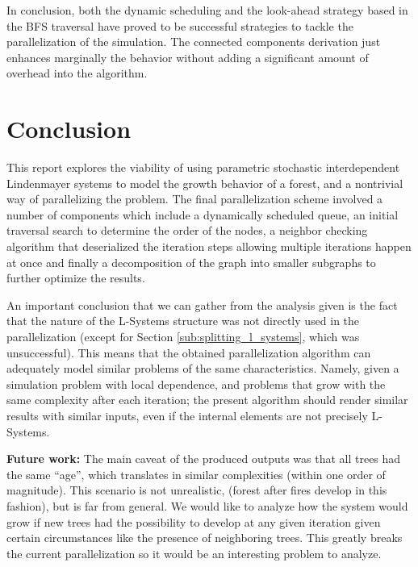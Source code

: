 \documentclass[letterpaper,twoside,11pt]{article}
\begin{document}
\begin{multicols}{2}
In conclusion, both the dynamic scheduling and the look-ahead strategy based in the BFS traversal have proved to be successful strategies to tackle the parallelization of the simulation. The connected components derivation just enhances marginally the behavior without adding a significant amount of overhead into the algorithm.



\section{Conclusion} %
\label{sec:conclusion}

This report explores the viability of using parametric stochastic interdependent Lindenmayer systems to model the growth behavior of a forest, and a nontrivial way of parallelizing the problem. The final parallelization scheme involved a number of components which include a dynamically scheduled queue, an initial traversal search to determine the order of the nodes, a neighbor checking algorithm that deserialized the iteration steps allowing multiple iterations happen at once and finally a decomposition of the graph into smaller subgraphs to further optimize the results.

An important conclusion that we can gather from the analysis given is the fact that the nature of the L-Systems structure was not directly used in the parallelization (except for Section \ref{sub:splitting_l_systems}, which was unsuccessful). This means that the obtained parallelization algorithm can adequately model similar problems of the same characteristics. Namely, given a simulation problem with local dependence, and problems that grow with the same complexity after each iteration; the present algorithm should render similar results with similar inputs, even if the internal elements are not precisely L-Systems.

\textbf{Future work:} The main caveat of the produced outputs was that all trees had the same ``age'', which translates in similar complexities (within one order of magnitude). This scenario is not unrealistic, (forest after fires develop in this fashion), but is far from general. We would like to analyze how the system would grow if new trees had the possibility to develop at any given iteration given certain circumstances like the presence of neighboring trees. This greatly breaks the current parallelization so it would be an interesting problem to analyze.




\end{multicols}
\end{document}
